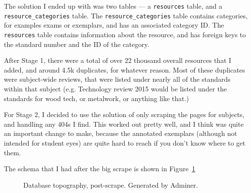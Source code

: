\documentclass{article}
\begin{document}
The solution I ended up with was two tables --- a \texttt{resources} table, and a \texttt{resource\_categories} table. The \texttt{resource\_categories} table contains categories, for examples exams or exemplars, and has an associated category ID. The \texttt{resources} table contains information about the resource, and has foreign keys to the standard number and the ID of the category.

After Stage 1, there were a total of over 22 thousand overall resources that I added, and around 4.5k duplicates, for whatever reason. Most of these duplicates were subject-wide reviews, that were listed under nearly all of the standards within that subject (e.g. Technology review 2015 would be listed under the standards for wood tech, or metalwork, or anything like that.)

For Stage 2, I decided to use the solution of only scraping the pages for subjects, and handling any 404s I find. This worked out pretty well, and I think was quite an important change to make, because the annotated exemplars (although not intended for student eyes) are quite hard to reach if you don't know where to get them.

The schema that I had after the big scrape is shown in Figure~\ref{fig:scrapetp}
\begin{figure}
    \begin{center}
    \caption{Database topography, post-scrape. Generated by Adminer.}
    \label{fig:scrapetp}
    \end{center}
\end{figure}
\end{document}
